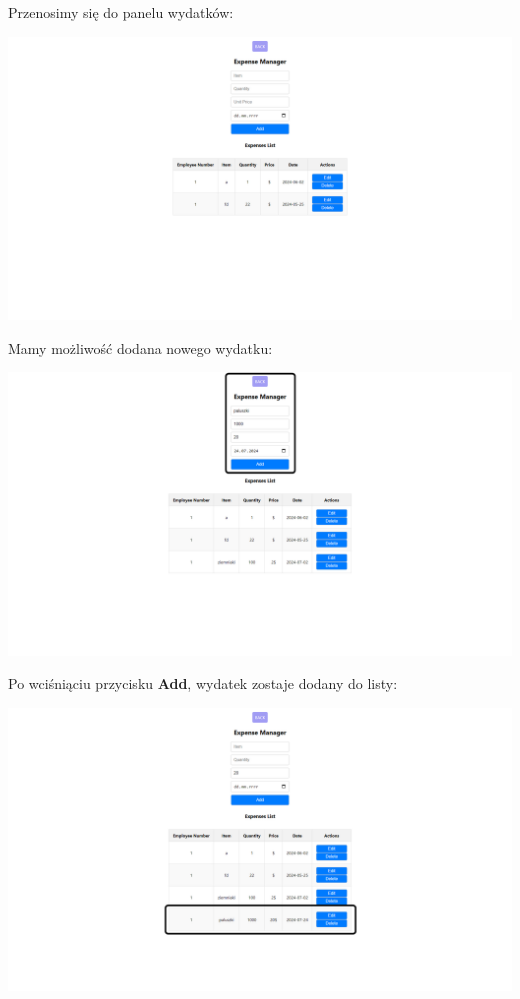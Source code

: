 \documentclass[12pt]{article}
\begin{document}
\begin{minipage}{\textwidth}
\noindent Przenosimy się do panelu wydatków:
\begin{center}
\includegraphics[width=\textwidth]{media/Expenses_in.png}
\end{center}
\end{minipage}

\begin{minipage}{\textwidth}
\noindent Mamy możliwość dodana nowego wydatku:
\begin{center}
\includegraphics[width=\textwidth]{media/Expenses_input.png}
\end{center}
\end{minipage}

\begin{minipage}{\textwidth}
\noindent Po wciśniąciu przycisku \textbf{Add}, wydatek zostaje dodany do listy:
\begin{center}
\includegraphics[width=\textwidth]{media/Expenses_add.png}
\end{center}
\end{minipage}
\end{document}

